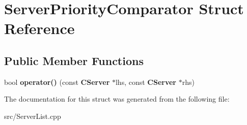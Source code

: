 \section{ServerPriorityComparator Struct Reference}
\label{structServerPriorityComparator}
\subsection*{Public Member Functions}
\begin{DoxyCompactItemize}
\item 
bool {\bfseries operator()} (const {\bf CServer} $\ast$lhs, const {\bf CServer} $\ast$rhs)\label{structServerPriorityComparator_a68bb88bccf9ba376ae8d5d6af51a99ff}

\end{DoxyCompactItemize}


The documentation for this struct was generated from the following file:\begin{DoxyCompactItemize}
\item 
src/ServerList.cpp\end{DoxyCompactItemize}
